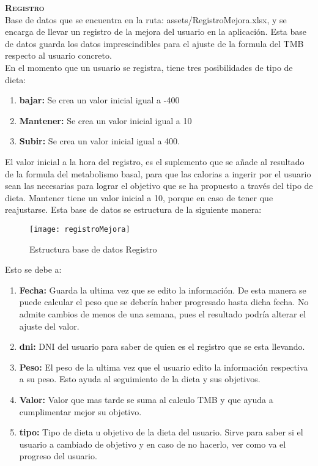 \textbf{\textsc{Registro}}\\
Base de datos que se encuentra en la ruta: assets/RegistroMejora.xlsx, y se encarga de llevar un registro de la mejora del usuario en la aplicación. Esta base de datos guarda los datos imprescindibles para el ajuste de la formula del TMB respecto al usuario concreto.\\
En el momento que un usuario se registra, tiene tres posibilidades de tipo de dieta:
\begin{enumerate}
\item \textbf{bajar:} Se crea un valor inicial igual a -400
\item \textbf{Mantener:} Se crea un valor inicial igual a 10
\item \textbf{Subir:} Se crea un valor inicial igual a 400. 
\end{enumerate}
El valor inicial a la hora del registro, es el suplemento que se añade al resultado de la formula del metabolismo basal, para que las calorias a ingerir por el usuario sean las necesarias para lograr el objetivo que se ha propuesto a través del tipo de dieta. Mantener tiene un valor inicial a 10, porque en caso de tener que reajustarse.
Esta base de datos se estructura de la siguiente manera:
\begin{figure}[htb]
\centering
\texttt{[image: registroMejora]} 
\caption{Estructura base de datos Registro}
\end{figure}
Esto se debe a:
\begin{enumerate}
\item \textbf{Fecha:} Guarda la ultima vez que se edito la información. De esta manera se puede calcular el peso que se debería haber progresado hasta dicha fecha. No admite cambios de menos de una semana, pues el resultado podría alterar el ajuste del valor.
\item \textbf{dni:} DNI del usuario para saber de quien es el registro que se esta llevando.
\item \textbf{Peso:} El peso de la ultima vez que el usuario edito la información respectiva a su peso. Esto ayuda al seguimiento de la dieta y sus objetivos.
\item \textbf{Valor:} Valor que mas tarde se suma al calculo TMB y que ayuda a cumplimentar mejor su objetivo.
\item \textbf{tipo:} Tipo de dieta u objetivo de la dieta del usuario. Sirve para saber si el usuario a cambiado de objetivo y en caso de no hacerlo, ver como va el progreso del usuario.
\end{enumerate}
